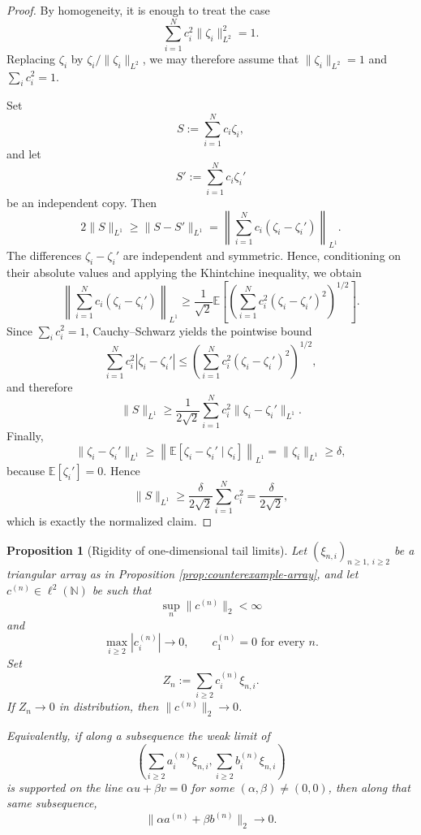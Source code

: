 \documentclass[11pt]{amsart}
\newtheorem{proposition}[theorem]{Proposition}
\newcommand{\E}{\mathbb E}
\newcommand{\N}{\mathbb N}
\begin{document}
\begin{proof}
By homogeneity, it is enough to treat the case
\[
\sum_{i=1}^N c_i^2 \|\zeta_i\|_{L^2}^2 = 1.
\]
Replacing $\zeta_i$ by $\zeta_i/\|\zeta_i\|_{L^2}$, we may therefore assume
that $\|\zeta_i\|_{L^2}=1$ and $\sum_i c_i^2=1$.

Set
\[
S := \sum_{i=1}^N c_i \zeta_i,
\]
and let
\[
S' := \sum_{i=1}^N c_i \zeta_i'
\]
be an independent copy. Then
\[
2\|S\|_{L^1}
\ge
\|S-S'\|_{L^1}
=
\left\|\sum_{i=1}^N c_i(\zeta_i-\zeta_i')\right\|_{L^1}.
\]
The differences $\zeta_i-\zeta_i'$ are independent and symmetric. Hence,
conditioning on their absolute values and applying the Khintchine inequality,
we obtain
\[
\left\|\sum_{i=1}^N c_i(\zeta_i-\zeta_i')\right\|_{L^1}
\ge
\frac{1}{\sqrt 2}
\E\left[\left(\sum_{i=1}^N c_i^2(\zeta_i-\zeta_i')^2\right)^{1/2}\right].
\]
Since $\sum_i c_i^2=1$, Cauchy--Schwarz yields the pointwise bound
\[
\sum_{i=1}^N c_i^2 |\zeta_i-\zeta_i'|
\le
\left(\sum_{i=1}^N c_i^2(\zeta_i-\zeta_i')^2\right)^{1/2},
\]
and therefore
\[
\|S\|_{L^1}
\ge
\frac{1}{2\sqrt 2}
\sum_{i=1}^N c_i^2 \|\zeta_i-\zeta_i'\|_{L^1}.
\]
Finally,
\[
\|\zeta_i-\zeta_i'\|_{L^1}
\ge
\left\|\E[\zeta_i-\zeta_i' \mid \zeta_i]\right\|_{L^1}
=
\|\zeta_i\|_{L^1}
\ge
\delta,
\]
because $\E[\zeta_i']=0$. Hence
\[
\|S\|_{L^1}
\ge
\frac{\delta}{2\sqrt 2}\sum_{i=1}^N c_i^2
=
\frac{\delta}{2\sqrt 2},
\]
which is exactly the normalized claim.
\end{proof}

\begin{proposition}[Rigidity of one-dimensional tail limits]
\label{prop:tail-rigidity}
Let $(\xi_{n,i})_{n \ge 1,\ i \ge 2}$ be a triangular array as in
Proposition \ref{prop:counterexample-array}, and let $c^{(n)} \in \ell^2(\N)$
be such that
\[
\sup_n \|c^{(n)}\|_2 < \infty
\]
and
\[
\max_{i \ge 2} |c_i^{(n)}| \longrightarrow 0,
\qquad
c_1^{(n)} = 0 \text{ for every } n.
\]
Set
\[
Z_n := \sum_{i \ge 2} c_i^{(n)} \xi_{n,i}.
\]
If $Z_n \to 0$ in distribution, then $\|c^{(n)}\|_2 \to 0$.

Equivalently, if along a subsequence the weak limit of
\[
\left(
\sum_{i \ge 2} a_i^{(n)} \xi_{n,i},
\sum_{i \ge 2} b_i^{(n)} \xi_{n,i}
\right)
\]
is supported on the line $\alpha u + \beta v = 0$ for some
$(\alpha,\beta) \ne (0,0)$, then along that same subsequence,
\[
\|\alpha a^{(n)} + \beta b^{(n)}\|_2 \longrightarrow 0.
\]
\end{proposition}
\end{document}

